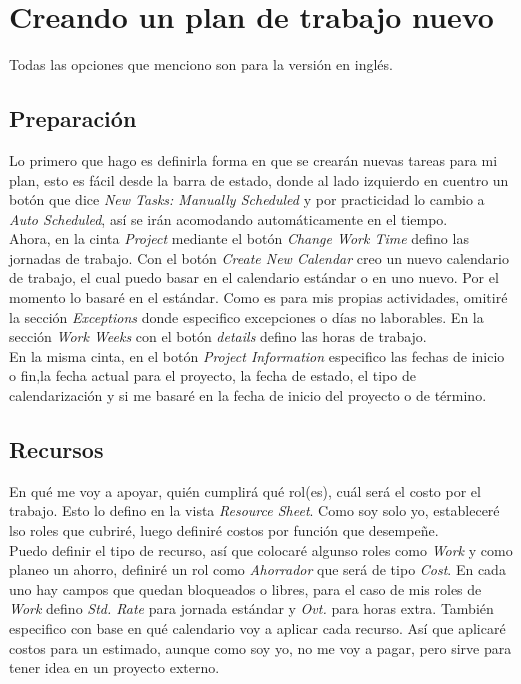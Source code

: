 \documentclass[11pt]{article} %
\begin{document}
\section{Creando un plan de trabajo nuevo}
Todas las opciones que menciono son para la versión en inglés.

\subsection{Preparación}
Lo primero que hago es definirla forma en que se crearán nuevas tareas para mi plan, esto es fácil desde la barra de estado, donde al lado izquierdo en cuentro un botón que dice \emph{New Tasks: Manually Scheduled} y por practicidad lo cambio a \emph{Auto Scheduled}, así se irán acomodando automáticamente en el tiempo.\\

Ahora, en la cinta \emph{Project} mediante el botón \emph{Change Work Time} defino las jornadas de trabajo. Con el botón \emph{Create New Calendar} creo un nuevo calendario de trabajo, el cual puedo basar en el calendario estándar o en uno nuevo. Por el momento lo basaré en el estándar. Como es para mis propias actividades, omitiré la sección \emph{Exceptions} donde especifico excepciones o días no laborables. En la sección \emph{Work Weeks} con el botón \emph{details} defino las horas de trabajo.\\

En la misma cinta, en el botón \emph{Project Information} especifico las fechas de inicio o fin,la fecha actual para el proyecto, la fecha de estado, el tipo de calendarización y si me basaré en la fecha de inicio del proyecto o de término.

\subsection{Recursos}
En qué me voy a apoyar, quién cumplirá qué rol(es), cuál será el costo por el trabajo. Esto lo defino en la vista \emph{Resource Sheet}. Como soy solo yo, estableceré lso roles que cubriré, luego definiré costos por función que desempeñe.\\

Puedo definir el tipo de recurso, así que colocaré algunso roles como \emph{Work} y como planeo un ahorro, definiré un rol como \emph{Ahorrador} que será de tipo \emph{Cost}. En cada uno hay campos que quedan bloqueados o libres, para el caso de mis roles de \emph{Work} defino \emph{Std. Rate} para jornada estándar y \emph{Ovt.} para horas extra. También especifico con base en qué calendario voy a aplicar cada recurso. Así que aplicaré costos para un estimado, aunque como soy yo, no me voy a pagar, pero sirve para tener idea en un proyecto externo.\\
\end{document}
